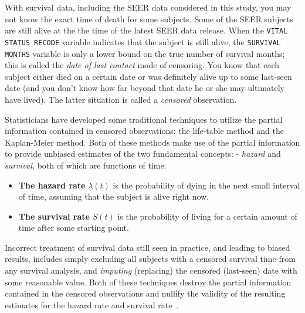 \documentclass[10pt,letterpaper]{article}
\newcommand{\codewhite}[1]{\colorbox{white}{\texttt{#1}}}
\begin{document}
With survival data, including the SEER data considered in this study, you may not know the exact time of death for some subjects. Some of the SEER subjects are still alive at the the time of the latest SEER data release. When the \codewhite{VITAL STATUS RECODE} variable indicates that the subject is still alive, the \codewhite{SURVIVAL MONTHS} variable is only a lower bound on the true number of survival months; this is called the \textit{date of last contact} mode of censoring. You know that each subject either died on a certain date or was definitely alive up to some last-seen date (and you don't know how far beyond that date he or she may ultimately have lived). The latter situation is called a \textit{censored} observation. 

Statisticians have developed some traditional techniques to utilize the partial information contained in censored observations: the life-table method and the Kaplan-Meier method. 
Both of these methods make use of the partial information to provide unbiased estimates of the two fundamental concepts: - \textit{hazard} and \textit{survival}, both of which are functions of time:

\begin{itemize}[noitemsep]
\item \textbf{The hazard rate} $\lambda(t)$ is the probability of dying in the next small interval of time, assuming that the subject is alive right now.
\item \textbf{The survival rate} $S(t)$  is the probability of living for a certain amount of time after some starting point.
\end{itemize}


Incorrect treatment of survival data still seen in practice, and leading to biased results, includes simply excluding all subjects with a censored survival time from any survival analysis, and \emph{imputing} (replacing) the censored (last-seen) date with some reasonable value. Both of these techniques destroy the partial information contained in the censored observations and nullify the validity of the resulting estimates for the hazard rate and survival rate~\cite{cam}.
\end{document}
